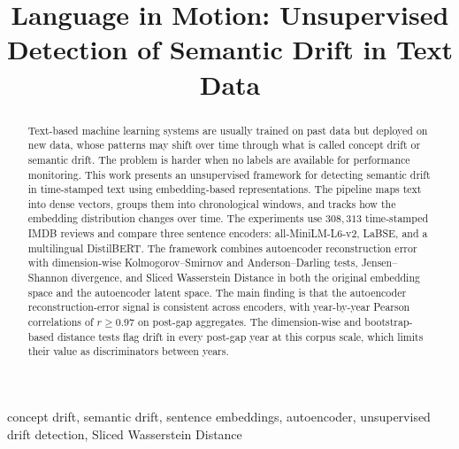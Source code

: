 \documentclass[conference]{IEEEtran}
\begin{document}
\title{Language in Motion: Unsupervised Detection of Semantic Drift in Text Data}

\author{
\and
{}
}

\maketitle

\begin{abstract}
Text-based machine learning systems are usually trained on past data but deployed on new data, whose patterns may shift over time through what is called concept drift or semantic drift. The problem is harder when no labels are available for performance monitoring. This work presents an unsupervised framework for detecting semantic drift in time-stamped text using embedding-based representations. The pipeline maps text into dense vectors, groups them into chronological windows, and tracks how the embedding distribution changes over time. The experiments use $308{,}313$ time-stamped IMDB reviews and compare three sentence encoders: all-MiniLM-L6-v2, LaBSE, and a multilingual DistilBERT. The framework combines autoencoder reconstruction error with dimension-wise Kolmogorov--Smirnov and Anderson--Darling tests, Jensen--Shannon divergence, and Sliced Wasserstein Distance in both the original embedding space and the autoencoder latent space. The main finding is that the autoencoder reconstruction-error signal is consistent across encoders, with year-by-year Pearson correlations of $r \geq 0.97$ on post-gap aggregates. The dimension-wise and bootstrap-based distance tests flag drift in every post-gap year at this corpus scale, which limits their value as discriminators between years.
\end{abstract}

\begin{IEEEkeywords}
concept drift, semantic drift, sentence embeddings, autoencoder, unsupervised drift detection, Sliced Wasserstein Distance
\end{IEEEkeywords}
\end{document}
